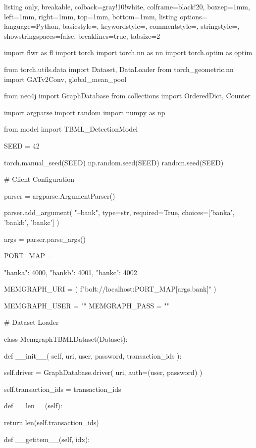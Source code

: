 \begin{tcblisting}{
listing only,
breakable,
colback=gray!10!white,
colframe=black!20,
boxsep=1mm,
left=1mm,
right=1mm,
top=1mm,
bottom=1mm,
listing options={
language=Python,
basicstyle=\scriptsize\ttfamily,
keywordstyle=\color{blue},
commentstyle=\color{gray},
stringstyle=\color{orange},
showstringspaces=false,
breaklines=true,
tabsize=2
}
}

import flwr as fl
import torch
import torch.nn as nn
import torch.optim as optim

from torch.utils.data import Dataset, DataLoader
from torch_geometric.nn import GATv2Conv, global_mean_pool

from neo4j import GraphDatabase
from collections import OrderedDict, Counter

import argparse
import random
import numpy as np

from model import TBML_DetectionModel

SEED = 42

torch.manual_seed(SEED)
np.random.seed(SEED)
random.seed(SEED)

# Client Configuration

parser = argparse.ArgumentParser()

parser.add_argument(
    "--bank",
    type=str,
    required=True,
    choices=['banka', 'bankb', 'bankc']
)

args = parser.parse_args()

PORT_MAP = {

    "banka": 4000,
    "bankb": 4001,
    "bankc": 4002

}

MEMGRAPH_URI = (
    f"bolt://localhost:{PORT_MAP[args.bank]}"
)

MEMGRAPH_USER = ""
MEMGRAPH_PASS = ""

# Dataset Loader

class MemgraphTBMLDataset(Dataset):

    def __init__(
        self,
        uri,
        user,
        password,
        transaction_ids
    ):

        self.driver = GraphDatabase.driver(
            uri,
            auth=(user, password)
        )

        self.transaction_ids = transaction_ids

    def __len__(self):

        return len(self.transaction_ids)

    def __getitem__(self, idx):


\end{tcblisting}
